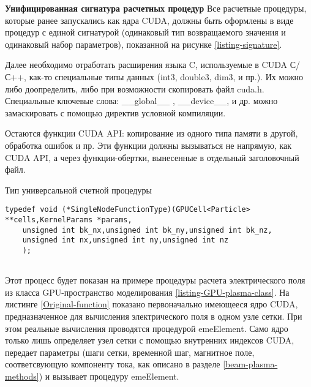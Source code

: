 \textbf{Унифицированная сигнатура расчетных процедур}
Все расчетные процедуры, которые ранее запускались как ядра CUDA, должны быть оформлены в виде процедур с единой сигнатурой (одинаковый тип возвращаемого значения и одинаковый набор параметров), показанной на рисунке \ref{listing-signature}.

Далее необходимо отработать расширения языка C, используемые в CUDA С/С++, как-то специальные типы данных
(int3, double3, dim3, и пр.). Их можно либо доопределить, либо при возможности скопировать файл cuda.h. Специальные ключевые слова: \_\_global\_\_ ,         \_\_device\_\_, и др. можно 
замаскировать с помощью директив условной компиляции.

Остаются функции CUDA API: копирование из одного типа памяти в другой, обработка ошибок и пр. Эти функции должны вызываться не напрямую, как CUDA API, а через функции-обертки, вынесенные в отдельный заголовочный файл.

\begin{ListingEnv}[!h]
	\captiondelim{ } %
\caption{Тип универсальной счетной процедуры}
\label{listing-signature}
	\begin{lstlisting}[language={[ISO]C++}]
	typedef void (*SingleNodeFunctionType)(GPUCell<Particle>  **cells,KernelParams *params,
	unsigned int bk_nx,unsigned int bk_ny,unsigned int bk_nz,
	unsigned int nx,unsigned int ny,unsigned int nz
	);
	
	\end{lstlisting}
\end{ListingEnv}

Этот процесс будет показан на примере процедуры расчета электрического поля из класса GPU-пространство моделирования \ref{listing-GPU-plasma-class}. На листинге \ref{Original-function} показано первоначально имеющееся ядро CUDA, предназначенное для вычисления электрического поля в одном узле сетки. При этом реальные вычисления проводятся процедурой emeElement. Само ядро только лишь определяет узел сетки с помощью внутренних индексов CUDA, передает параметры (шаги сетки, временной шаг, магнитное поле, соответсвующую компоненту тока, как описано в разделе \ref{beam-plasma-methods}) и вызывает процедуру emeElement.


